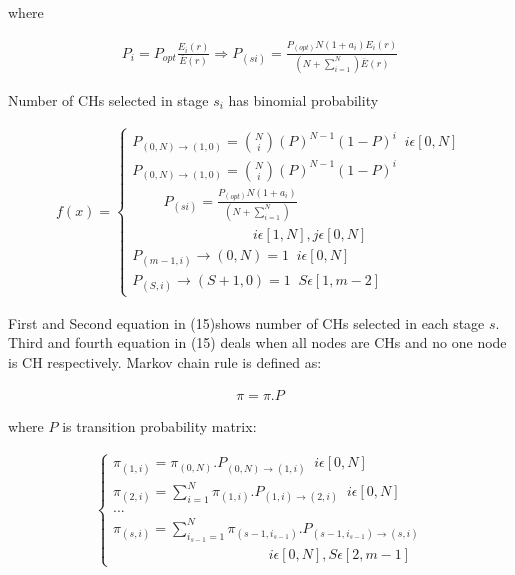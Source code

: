 \documentclass[10pt, conference, compsocconf]{IEEEtran}
\begin{document}
 where

 \begin{eqnarray}
P_{i} = P_{opt} \frac{E_{i}(r)}{ \overline{E}(r)}\Longrightarrow P_{(si)}=\frac{P_{(opt)}N(1+a_{i})E_{i}(r)}{(N+\sum^{N}_{i=1})\overline{E}(r)}
 \end{eqnarray}

Number of CHs selected in stage $s_{i}$ has binomial probability

\small
\begin{eqnarray}
f(x)=
 \begin{cases}
P_{(0,N)\longrightarrow(1,0)}= {N \choose i}(P) ^{N-1}(1-P)^{i}    \;\;i\epsilon[0,N] \\
 P_{(0,N)\longrightarrow(1,0)}= {N \choose i}(P) ^{N-1}(1-P)^{i}\\ \;\;\;\;\;\;\;\;P_{(si)}=\frac{P_{(opt)}N(1+a_{i})}{(N+\sum^{N}_{i=1})}\\
 \;\;\;\;\;\;\; \;\;\;\;\;\;\; \;\;\;\;\;\;\;\;\;\; \;\;\;\;\;\;\;i\epsilon[1,N], j\epsilon[0,N]\\
 P_{(m-1,i)}\longrightarrow(0,N)=1 \;\; i\epsilon[0,N]\\
 P_{(S,i)}\longrightarrow(S+1,0)=1 \;\;S\epsilon[1,m-2]
\end{cases}
\end{eqnarray}
\normalsize

First and Second equation in (15)shows number of CHs selected in each stage $s$. Third and fourth equation in (15) deals when all nodes are CHs and no one node is CH respectively. Markov chain rule is defined as:

\begin{eqnarray}
\pi=\pi.P
\end{eqnarray}

where $P$ is transition probability matrix:

\begin{eqnarray}
\begin{cases}
  \pi_{(1,i)}=\pi_{(0,N)}.P_{(0,N)\longrightarrow(1,i)} \;\;i\epsilon[0,N]\\
\pi_{(2,i)}=\sum^{N}_{i=1} \pi_{(1,i)}.P_{(1,i)\longrightarrow(2,i)} \;\;i\epsilon[0,N]\\
... \\                                                                                                                                                                      \pi_{(s,i)}=\sum^{N}_{i_{s-1}=1} \pi_{(s-1,i_{s-1})}.P_{(s-1,i_{s-1})\longrightarrow(s,i)} \\
\;\;\;\;\;\;\; \;\;\;\;\;\;\; \;\;\;\;\;\;\;\;\;\; \;\;\;\;\;\;\; \;\;\;\;\;\;\;\;\;i\epsilon[0,N],S\epsilon[2,m-1]
\end{cases}
 \end{eqnarray}
\end{document}

